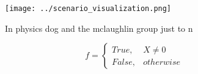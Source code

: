 \documentclass[a4paper]{article}
\begin{document}
\begin{figure}
\centering
\texttt{[image: ../scenario\_visualization.png]}
\caption{In physics dog and the mclaughlin group just to n
}
\end{figure}
 
\begin{equation}   f =
\begin{cases} True, & X \neq 0\\
False, & otherwise
\end{cases}
\end{equation}
\end{document}
